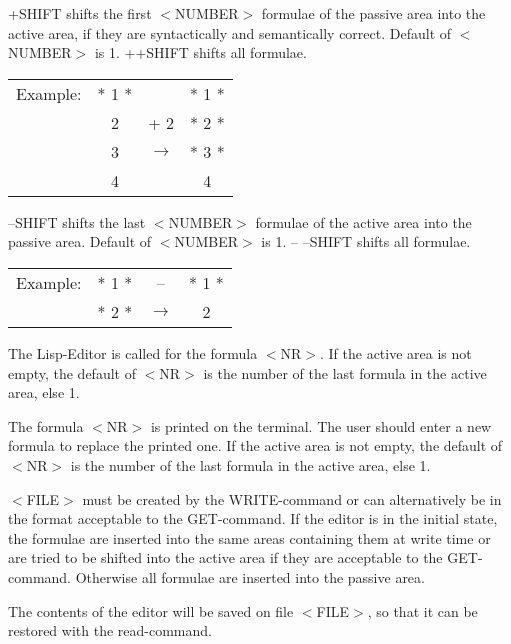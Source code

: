 \index{+[SHIFT]}\edc{+[SHIFT] [$<$NUMBER$>$]\\
++[SHIFT]}%
{+SHIFT shifts the first $<$NUMBER$>$ formulae of the passive area into the 
active  area, if they are syntactically and semantically correct. Default
 of $<$NUMBER$>$ is 1. 
++SHIFT shifts all formulae. 
\begin{tabular}{lccc}
Example: &	* 1 *       &&                   * 1 *\\
&	   2        &    + 2   &         * 2 *\\
&	   3   &  $\longrightarrow$   &   * 3 *\\
&	   4      &&                         4
\end{tabular}}

\index{--[SHIFT]}\edc{--[SHIFT] 
[$<$NUMBER$>$]\\
-- --[SHIFT]}%
{--SHIFT shifts the last $<$NUMBER$>$ formulae of the active area into the 
passive area. Default of $<$NUMBER$>$ is 1. -- --SHIFT shifts all formulae. 

\begin{tabular}{lccc}
Example:	&* 1 *      &     --      &        * 1 *\\
	&* 2 * &   $\longrightarrow$  &      2
\end{tabular}}

%
{The Lisp-Editor is called for the formula $<$NR$>$.
If the active area is not empty, the default of $<$NR$>$ is the number of 
the last formula in the active area, else 1.}

%
{The formula $<$NR$>$ is printed on the terminal. The user should enter a new 
formula to replace the printed one. 
If the active area is not empty, the default of $<$NR$>$ is the number of the
 last 
formula in the active area, else 1. }

%
{$<$FILE$>$ must be created by the WRITE-command or can alternatively be in
 the format acceptable to the GET-command. If the editor is in the 
initial state, the formulae are inserted into the same areas containing 
them at write time or are tried to be shifted into the active area if they
 are acceptable to the GET-command. Otherwise all formulae are inserted into
 the passive 
area. }

%
{The contents of the editor will be saved on file $<$FILE$>$, so that it can
 be 
restored with the read-command. }

